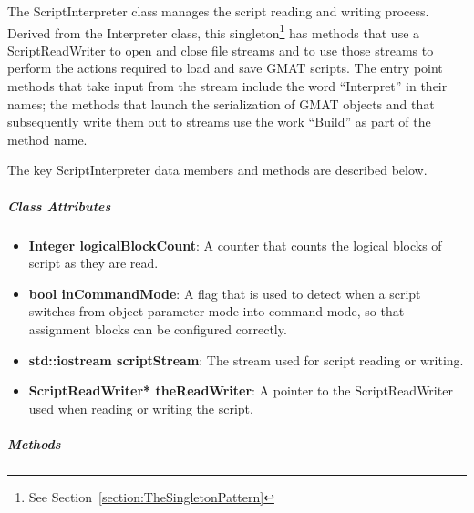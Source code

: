 The ScriptInterpreter class manages the script reading and writing process.  Derived from the
Interpreter class, this singleton\footnote{See Section~\ref{section:TheSingletonPattern}} has
methods that use a ScriptReadWriter to open and close file streams and to use those streams to
perform the actions required to load and save GMAT scripts.  The entry point methods that take input
from the stream include the word ``Interpret'' in their names; the methods that launch the
serialization of GMAT objects and that subsequently write them out to streams use the work ``Build''
as part of the method name.

The key ScriptInterpreter data members and methods are described below.

\subparagraph{\textit{Class Attributes}}

\begin{itemize}
\item \textbf{Integer logicalBlockCount}: A counter that counts the logical blocks of script as
they are read.
\item \textbf{bool inCommandMode}: A flag that is used to detect when a script switches from object
parameter mode into command mode, so that assignment blocks can be configured correctly.
\item\textbf{std::iostream scriptStream}: The stream used for script reading or writing.
\item\textbf{ScriptReadWriter* theReadWriter}: A pointer to the ScriptReadWriter used when reading
or writing the script.
\end{itemize}

\subparagraph{\textit{Methods}}

